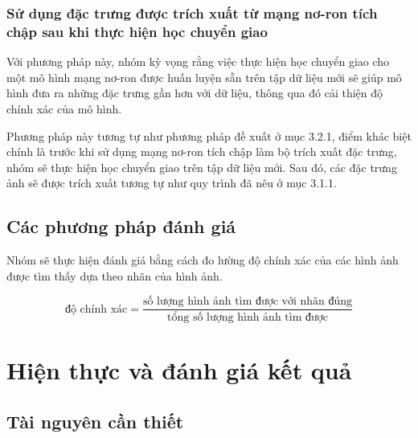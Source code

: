 \documentclass[a4paper,14pt]{extreport}
\begin{document}
\subsection{Sử dụng đặc trưng được trích xuất từ mạng nơ-ron tích chập sau khi thực hiện học chuyển giao }

Với phương pháp này, nhóm kỳ vọng rằng việc thực hiện học chuyển giao cho một mô hình mạng nơ-ron 
được huấn luyện sẵn trên tập dữ liệu mới sẽ giúp mô hình đưa ra những đặc trưng gần hơn với dữ liệu, 
thông qua đó cải thiện độ chính xác của mô hình.

Phương pháp này tương tự như phương pháp đề xuất ở mục 3.2.1, điểm khác biệt chính là trước khi sử dụng mạng nơ-ron tích chập làm bộ trích xuất đặc trưng, nhóm sẽ thực hiện học chuyển giao trên tập dữ liệu mới. Sau đó, các đặc trưng ảnh sẽ được trích xuất tương tự như quy trình đã nêu ở mục 3.1.1.

\section{ Các phương pháp đánh giá }
Nhóm sẽ thực hiện đánh giá bằng cách đo lường độ chính xác của các hình ảnh được tìm thấy dựa theo nhãn 
của hình ảnh.

\[ \text{độ chính xác} = \frac{\text{số lượng hình ảnh tìm được với nhãn đúng}}{\text{tổng số lượng hình ảnh tìm được}} \]
\chapter{Hiện thực và đánh giá kết quả}
\section{Tài nguyên cần thiết}
\end{document}
